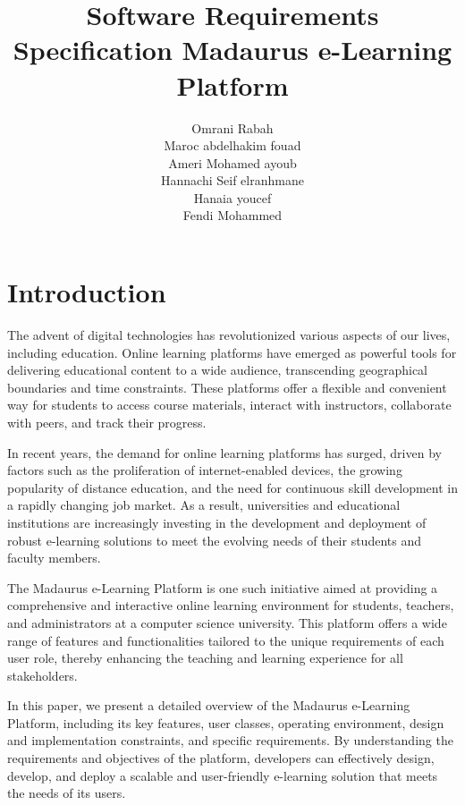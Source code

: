 \documentclass{IEEEtran}
\begin{document}
\title{Software Requirements Specification \for 
 Madaurus e-Learning Platform}
\author{
Omrani Rabah \\
Maroc abdelhakim fouad \\
Ameri Mohamed ayoub \\
Hannachi Seif elranhmane \\
Hanaia youcef  \\
Fendi Mohammed

}
\maketitle

\section{Introduction}
The advent of digital technologies has revolutionized various aspects of our lives, including education. Online learning platforms have emerged as powerful tools for delivering educational content to a wide audience, transcending geographical boundaries and time constraints. These platforms offer a flexible and convenient way for students to access course materials, interact with instructors, collaborate with peers, and track their progress.

In recent years, the demand for online learning platforms has surged, driven by factors such as the proliferation of internet-enabled devices, the growing popularity of distance education, and the need for continuous skill development in a rapidly changing job market. As a result, universities and educational institutions are increasingly investing in the development and deployment of robust e-learning solutions to meet the evolving needs of their students and faculty members.

The Madaurus e-Learning Platform is one such initiative aimed at providing a comprehensive and interactive online learning environment for students, teachers, and administrators at a computer science university. This platform offers a wide range of features and functionalities tailored to the unique requirements of each user role, thereby enhancing the teaching and learning experience for all stakeholders.

In this paper, we present a detailed overview of the Madaurus e-Learning Platform, including its key features, user classes, operating environment, design and implementation constraints, and specific requirements. By understanding the requirements and objectives of the platform, developers can effectively design, develop, and deploy a scalable and user-friendly e-learning solution that meets the needs of its users.
\end{document}
